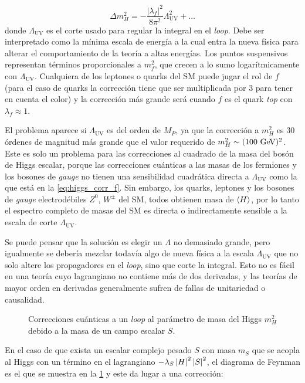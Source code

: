 \begin{equation}
  \Delta m_H^2 = -\frac{|\lambda_f|^2}{8\pi^2} \Lambda^2_{\text{UV}} + \ldots
  \label{eq:higgs_corr_f}
\end{equation}
%
donde $\Lambda_\text{UV}$ es el corte usado para regular la integral en el
\emph{loop}. Debe ser interpretado como la mínima escala de energía a la
cual entra la nueva física para alterar el comportamiento de la teoría a altas
energías. Los puntos suspensivos representan términos proporcionales a $m_f^2$,
que crecen a lo sumo logarítmicamente con $\Lambda_\text{UV}$. Cualquiera de los
leptones o quarks del SM puede jugar el rol de $f$ (para el caso de quarks la
corrección tiene que ser multiplicada por 3 para tener en cuenta el color) y
la corrección más grande será cuando $f$ es el quark \emph{top} con
$\lambda_f \approx 1$.

El problema aparece si $\Lambda_\text{UV}$ es del orden de $M_P$, ya que la
corrección a $m_H^2$ es 30 órdenes de magnitud más grande que el valor requerido
de $m_H^2 \sim (100 \gev)^2$. Este es solo un problema para las correcciones al
cuadrado de la masa del bosón de Higgs escalar, porque las correcciones
cuánticas a las masas de los fermiones y los bosones de \emph{gauge} no tienen una
sensibilidad cuadrática directa a $\Lambda_\text{UV}$ como la que está en la
\cref{eq:higgs_corr_f}. Sin embargo, los quarks, leptones y los bosones de \emph{gauge}
electrodébiles $Z^0$, $W^{\pm}$ del SM, todos obtienen masa de $\langle H \rangle$, por
lo tanto el espectro completo de masas del SM es directa o indirectamente
sensible a la escala de corte $\Lambda_\text{UV}$.

Se puede pensar que la solución es elegir un $\Lambda$ no demasiado grande, pero
igualmente se debería mezclar todavía algo de nueva física a la escala
$\Lambda_\text{UV}$ que no solo altere los propagadores en el \emph{loop}, sino que
corte la integral. Esto no es fácil en una teoría cuyo lagrangiano no contiene
más de dos derivadas, y las teorías de mayor orden en derivadas generalmente
sufren de fallas de unitariedad o causalidad.

\begin{figure}[!htbp]
  \centering 
  \caption{Correcciones cuánticas a un \emph{loop} al parámetro de masa del Higgs
    $m_H^2$ debido a la masa de un campo escalar $S$.}
  \label{fig:higgs_correction_s}
\end{figure}

En el caso de que exista un escalar complejo pesado $S$ con masa $m_S$ que se
acopla al Higgs con un término en el lagrangiano $-\lambda_S \left| H \right|^2 \left| S \right|^2$,
el diagrama de Feynman es el que se muestra en la
\cref{fig:higgs_correction_s} y este da lugar a una corrección:

